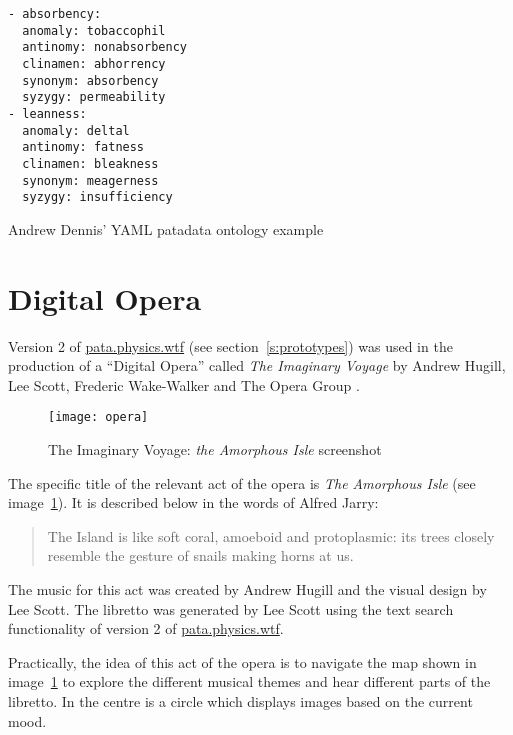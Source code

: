 \begin{listing}[!htbp] %
  \begin{verbatim}
- absorbency:
  anomaly: tobaccophil
  antinomy: nonabsorbency
  clinamen: abhorrency
  synonym: absorbency
  syzygy: permeability
- leanness:
  anomaly: deltal
  antinomy: fatness
  clinamen: bleakness
  synonym: meagerness
  syzygy: insufficiency
  \end{verbatim}
\caption[Dennis' patadata ontology example]{Andrew Dennis' \ac{YAML} patadata ontology example}
\label{code:dennisont}
\end{listing}


\section{Digital Opera}
\label{s:opera}

Version 2 of \url{pata.physics.wtf} (see section~\ref{s:prototypes}) was used in the production of a ``Digital Opera'' called \textit{The Imaginary Voyage} \autocite{Hugill2013a,Hugill2014} by Andrew Hugill, Lee Scott, Frederic Wake-Walker and The Opera Group \autocite{Mahogany2016}.

\begin{figure}[!htbp]
  \centering
  \texttt{[image: opera]}
\caption[Imaginary Voyage: \textit{Amorphous Isle}]{The Imaginary Voyage: \textit{the Amorphous Isle} screenshot}
\label{img:opera}
\end{figure}

The specific title of the relevant act of the opera is \textit{The Amorphous Isle} \autocite{Hugill2014a} (see image~\ref{img:opera}). It is described below in the words of Alfred Jarry:

\begin{quotation}
  The Island is like soft coral, amoeboid and protoplasmic: its trees closely resemble the gesture of snails making horns at us. 
\end{quotation}

The music for this act was created by Andrew Hugill and the visual design by Lee Scott. The libretto was generated by Lee Scott using the text search functionality of version 2 of \url{pata.physics.wtf}.

Practically, the idea of this act of the opera is to navigate the map shown in image~\ref{img:opera} to explore the different musical themes and hear different parts of the libretto. In the centre is a circle which displays images based on the current mood.

